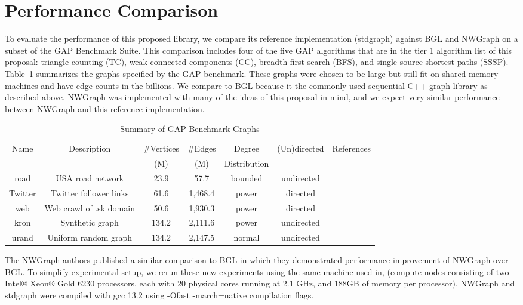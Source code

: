 \section{Performance Comparison} \label{performance}
To evaluate the performance of this proposed library, we compare its reference implementation
(stdgraph) against BGL and NWGraph on a subset of the GAP Benchmark Suite\cite{gapbs_2023}.
This comparison includes four of the five GAP algorithms that are in the tier 1 algorithm list of this proposal:
triangle counting (TC), weak connected components (CC), breadth-first search (BFS),
and single-source shortest paths (SSSP).
Table~\ref{tab:gap_graphs} summarizes the graphs specified by the GAP benchmark.
These graphs were chosen to be large but still fit on shared memory machines and have edge counts in the billions.
We compare to BGL because it the commonly used sequential C++ graph library as described above.
NWGraph was implemented with many of the ideas of this proposal in mind, and we expect very similar performance
between NWGraph and this reference implementation.

\begin{table}[h!]
\centering
\begin{tabular}{c c c c c c c}
Name & Description & \#Vertices & \#Edges & Degree & (Un)directed & References \\
     &             & (M)        & (M)     & Distribution & & \\\hline
road & USA road network & 23.9 & 57.7 & bounded & undirected & \\\hline
Twitter & Twitter follower links & 61.6 & 1,468.4 & power & directed & \\\hline
web & Web crawl of .sk domain & 50.6 & 1,930.3 & power & directed &\\\hline
kron & Synthetic graph & 134.2 & 2,111.6 & power & undirected & \\\hline
urand & Uniform random graph & 134.2 & 2,147.5 & normal & undirected & \\\hline
\end{tabular}
\caption{Summary of GAP Benchmark Graphs}
\label{tab:gap_graphs}
\end{table}

The NWGraph authors published a similar comparison to BGL\cite{REF_nwgraph_library} in which they
demonstrated performance improvement of NWGraph over BGL.
To simplify experimental setup, we rerun these new experiments using the same machine used in\cite{REF_nwgraph_library},
(compute nodes consisting of two Intel® Xeon® Gold 6230 processors, each with 20 physical cores running at 2.1 GHz,
and 188GB of memory per processor).
NWGraph and stdgraph were compiled with gcc 13.2 using -Ofast -march=native compilation flags.

